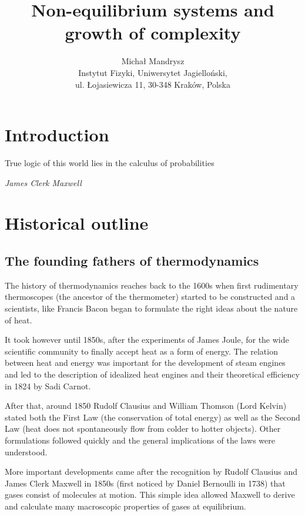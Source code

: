 \documentclass[a4paper,12pt]{article}
\begin{document}
\title{Non-equilibrium systems and growth of complexity}

\author{Michał Mandrysz \\
Instytut Fizyki, Uniwersytet Jagielloński, \\ul. Łojasiewicza
11, 30-348 Kraków, Polska }

\maketitle

\tableofcontents

\newpage

\section{Introduction}

\newpage
\epigraph{True logic of this world lies in the calculus of probabilities}{\textit{James Clerk Maxwell}}
\section{Historical outline}
\subsection{The founding fathers of thermodynamics}
The history of thermodynamics reaches back to the 1600s when first rudimentary thermoscopes (the ancestor of the thermometer) started to be constructed and a scientists, like Francis Bacon began to formulate the right ideas about the nature of heat. 

It took however until 1850s, after the experiments of James Joule, for the wide scientific community to finally accept heat as a form of energy. The relation between heat and energy was important for the development of steam engines and led to the description of idealized heat engines and their theoretical efficiency in 1824 by Sadi Carnot. 

After that, around 1850 Rudolf Clausius and William Thomson (Lord Kelvin) stated both the First Law (the conservation of total energy) as well as the Second Law (heat does not spontaneously flow from colder to hotter objects). Other formulations followed quickly and the general implications of the laws were understood. 

More important developments came after the recognition by Rudolf Clausius and James Clerk Maxwell in 1850s (first noticed by Daniel Bernoulli in 1738) that gases consist of molecules at motion. This simple idea allowed Maxwell to derive and calculate many macroscopic properties of gases at equilibrium. 
\end{document}
